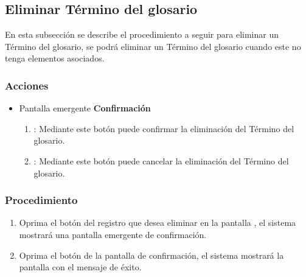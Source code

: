 \subsection{Eliminar Término del glosario}

En esta subsección se describe el procedimiento a seguir para eliminar un Término del glosario, se podrá eliminar un Término del glosario cuando este no tenga elementos asociados.

\subsubsection{Acciones}
\begin{itemize}
  \item Pantalla emergente \textbf{Confirmación}
  \begin{enumerate}
	\item {}: Mediante este botón puede confirmar la eliminación del Término del glosario.
	\item {}: Mediante este botón puede cancelar la eliminación del Término del glosario.
  \end{enumerate}
\end{itemize}

\subsubsection{Procedimiento}
\begin{enumerate}
	\item Oprima el botón \btnEliminar del registro que desea eliminar en la pantalla , el sistema mostrará una pantalla emergente de confirmación.
	
	\item Oprima el botón  de la pantalla de confirmación, el sistema mostrará la pantalla  con el mensaje de éxito.
\end{enumerate}

